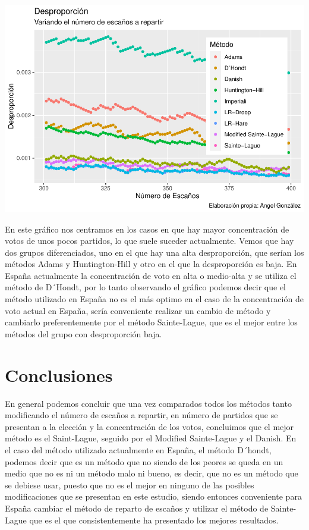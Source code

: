 \documentclass[12pt,a4paper,]{book}
\numberwithin{dummy}{section}
\theoremstyle{ocrenumbox}
\theoremstyle{blacknumex}
\theoremstyle{blacknumbox}
\theoremstyle{ocrenum}
\theoremstyle{ocrenum}
\begin{document}
\begin{center}\includegraphics[width=0.95\linewidth]{figurasR/unnamed-chunk-50-1} \end{center}

En este gráfico nos centramos en los casos en que hay mayor
concentración de votos de unos pocos partidos, lo que suele suceder
actualmente. Vemos que hay dos grupos diferenciados, uno en el que hay
una alta desproporción, que serían los métodos Adams y Huntington-Hill y
otro en el que la desproporción es baja. En España actualmente la
concentración de voto en alta o medio-alta y se utiliza el método de
D´Hondt, por lo tanto observando el gráfico podemos decir que el método
utilizado en España no es el más optimo en el caso de la concentración
de voto actual en España, sería conveniente realizar un cambio de método
y cambiarlo preferentemente por el método Sainte-Lague, que es el mejor
entre los métodos del grupo con desproporción baja.

\hypertarget{conclusiones}{%
\section{Conclusiones}\label{conclusiones}}

En general podemos concluir que una vez comparados todos los métodos
tanto modificando el número de escaños a repartir, en número de partidos
que se presentan a la elección y la concentración de los votos,
concluimos que el mejor método es el Saint-Lague, seguido por el
Modified Sainte-Lague y el Danish. En el caso del método utilizado
actualmente en España, el método D´hondt, podemos decir que es un método
que no siendo de los peores se queda en un medio que no es ni un método
malo ni bueno, es decir, que no es un método que se debiese usar, puesto
que no es el mejor en ninguno de las posibles modificaciones que se
presentan en este estudio, siendo entonces conveniente para España
cambiar el método de reparto de escaños y utilizar el método de
Sainte-Lague que es el que consistentemente ha presentado los mejores
resultados.
\end{document}
